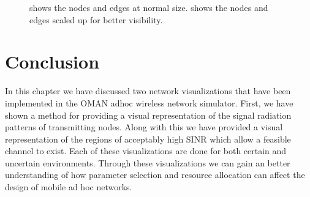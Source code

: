 \begin{figure}[ht]
\centering
{}
  \caption{ shows the nodes and edges at normal size.   shows the nodes and edges scaled up for better visibility.}
\label{fig:3d_terrain_node_scale}
\end{figure}

\section{Conclusion}
In this chapter we have discussed two network visualizations that have been implemented in the OMAN adhoc wireless network simulator.  First, we have shown a method for providing a visual representation of the signal radiation patterns of transmitting nodes.  Along with this we have provided a visual representation of the regions of acceptably high SINR which allow a feasible channel to exist.  Each of these visualizations are done for both certain and uncertain environments.  Through these visualizations we can gain an better understanding of how parameter selection and resource allocation can affect the design of mobile ad hoc networks.

